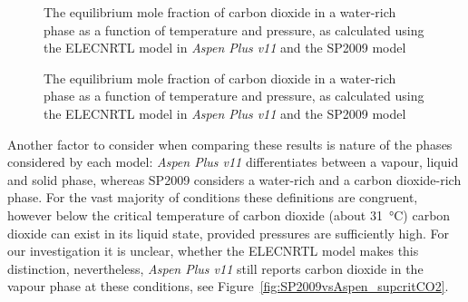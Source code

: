     \begin{figure}[H]
        \centering
        
        \caption[Comparison of the equilibrium mole fraction of carbon dioxide in a water-rich phase predictions. Part 1.]{The equilibrium mole fraction of carbon dioxide in a water-rich phase as a function of temperature and pressure, as calculated using the ELECNRTL model in \emph{Aspen Plus v11} and the \ac{SP2009} model}
        \label{fig:SP2009vsAspen_xCO2_part2}
    \end{figure}
    \begin{figure}[H]
        \centering
        
        \caption[Comparison of the equilibrium mole fraction of carbon dioxide in a water-rich phase predictions. Part 2.]{The equilibrium mole fraction of carbon dioxide in a water-rich phase as a function of temperature and pressure, as calculated using the ELECNRTL model in \emph{Aspen Plus v11} and the \ac{SP2009} model}
        \label{fig:SP2009vsAspen_xCO2_part1}
    \end{figure}


    Another factor to consider when comparing these results is nature of the phases considered by each model: \emph{Aspen Plus v11} differentiates between a vapour, liquid and solid phase, whereas \ac{SP2009} considers a water-rich and a carbon dioxide-rich phase. For the vast majority of conditions these definitions are congruent, however below the critical temperature of carbon dioxide (about \qty{31}{\degreeCelsius}) carbon dioxide can exist in its liquid state, provided pressures are sufficiently high. For our investigation it is unclear, whether the ELECNRTL model makes this distinction, nevertheless, \emph{Aspen Plus v11} still reports carbon dioxide in the vapour phase at these conditions, see Figure~\ref{fig:SP2009vsAspen_supcritCO2}.

